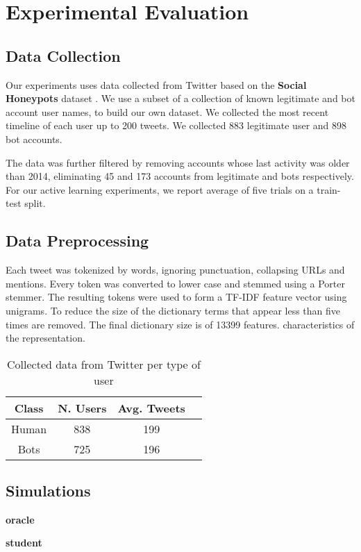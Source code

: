 \section{Experimental Evaluation}

\subsection{Data Collection}
%
Our experiments uses data collected from Twitter based on the \textbf{Social Honeypots} dataset \cite{lee:aaai11}. We use a subset of a collection of known legitimate and bot account user names, to build our own dataset. We collected the most recent timeline of each user up to 200 tweets. We collected 883 legitimate user and 898 bot accounts. 

The data was further filtered by removing accounts whose last activity was older than 2014, eliminating 45 and 173 accounts from legitimate and bots respectively. For our active learning experiments, we report average of five trials on a train-test split. 


\subsection{Data Preprocessing}
%
Each tweet was tokenized by words, ignoring punctuation, collapsing URLs and mentions. Every token was converted to lower case and stemmed using a Porter stemmer. The resulting tokens were used to form a TF-IDF feature vector using unigrams. To reduce the size of the dictionary terms that appear less than five times are removed. The final dictionary size is of 13399 features.  characteristics of the representation.

\begin{table}[htdp]
\caption{Collected data from Twitter per type of user}
\begin{center}
\begin{tabular}{|c|c|c|c|} \hline
\textbf{Class} & \textbf{N. Users} &\textbf{Avg. Tweets} \\  \hline
Human & 838 & 199 \\ \hline
Bots & 725  & 196 \\ \hline
\end{tabular}
\end{center}
\label{tab:data}
\end{table}%


\subsection{Simulations}

\textbf{oracle}

\textbf{student}
